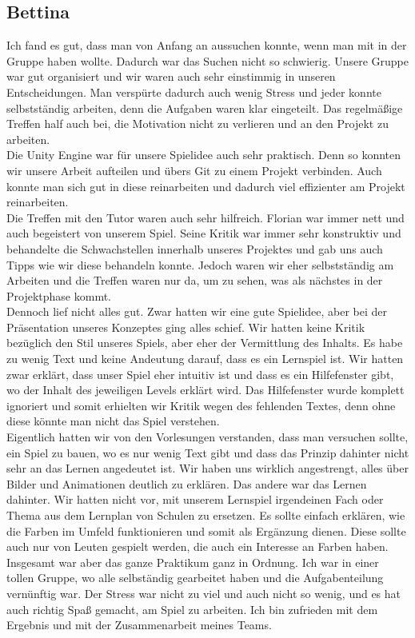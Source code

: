 \documentclass[10pt,a4paper,notitlepage]{report}
\begin{document}
	\subsection{Bettina}
	Ich fand es gut, dass man von Anfang an aussuchen konnte, wenn man mit in der Gruppe haben wollte. Dadurch war das Suchen nicht so schwierig. Unsere Gruppe war gut organisiert und wir waren auch sehr einstimmig in unseren Entscheidungen. Man verspürte dadurch auch wenig Stress und jeder konnte selbstständig arbeiten, denn die Aufgaben waren klar eingeteilt. Das regelmäßige Treffen half auch bei, die Motivation nicht zu verlieren und an den Projekt zu arbeiten.\\
	Die Unity Engine war für unsere Spielidee auch sehr praktisch. Denn so konnten wir unsere Arbeit aufteilen und übers Git zu einem Projekt verbinden. Auch konnte man sich gut in diese reinarbeiten und dadurch viel effizienter am Projekt reinarbeiten.\\
	Die Treffen mit den Tutor waren auch sehr hilfreich. Florian war immer nett und auch begeistert von unserem Spiel. Seine Kritik war immer sehr konstruktiv und behandelte die Schwachstellen innerhalb unseres Projektes und gab uns auch Tipps wie wir diese behandeln konnte. Jedoch waren wir eher selbstständig am Arbeiten und die Treffen waren nur da, um zu sehen, was als nächstes in der Projektphase kommt.\\
	Dennoch lief nicht alles gut. Zwar hatten wir eine gute Spielidee, aber bei der Präsentation unseres Konzeptes ging alles schief. Wir hatten keine Kritik bezüglich den Stil unseres Spiels, aber eher der Vermittlung des Inhalts. Es habe zu wenig Text und keine Andeutung darauf, dass es ein Lernspiel ist. Wir hatten zwar erklärt, dass unser Spiel eher intuitiv ist und dass es ein Hilfefenster gibt, wo der Inhalt des jeweiligen Levels erklärt wird. Das Hilfefenster wurde komplett ignoriert und somit erhielten wir Kritik wegen des fehlenden Textes, denn ohne diese könnte man nicht das Spiel verstehen.\\
	Eigentlich hatten wir von den Vorlesungen verstanden, dass man versuchen sollte, ein Spiel zu bauen, wo es nur wenig Text gibt und dass das Prinzip dahinter nicht  sehr an das Lernen angedeutet ist. Wir haben uns wirklich angestrengt, alles über Bilder und Animationen deutlich zu erklären. Das andere war das Lernen dahinter. Wir hatten nicht vor, mit unserem Lernspiel irgendeinen Fach oder Thema aus dem Lernplan von Schulen zu ersetzen. Es sollte einfach erklären, wie die Farben im Umfeld funktionieren und somit als Ergänzung dienen. Diese sollte auch nur von Leuten gespielt werden, die auch ein Interesse an Farben haben.\\
	Insgesamt war aber das ganze Praktikum ganz in Ordnung. Ich war in einer tollen Gruppe, wo alle selbständig gearbeitet haben und die Aufgabenteilung vernünftig war. Der Stress war nicht zu viel und auch nicht so wenig, und es hat auch richtig Spaß gemacht, am Spiel zu arbeiten. Ich bin zufrieden mit dem Ergebnis und mit der Zusammenarbeit meines Teams.\\
\end{document}
